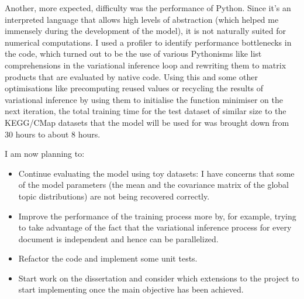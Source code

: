 \documentclass[12pt,a4]{article}
\begin{document}
Another, more expected, difficulty was the performance of Python. Since it's an interpreted language that allows high levels of abstraction (which helped me immensely during the development of the model), it is not naturally suited for numerical computations. I used a profiler to identify performance bottlenecks in the code, which turned out to be the use of various Pythonisms like list comprehensions in the variational inference loop and rewriting them to matrix products that are evaluated by native code. Using this and some other optimisations like precomputing reused values or recycling the results of variational inference by using them to initialise the function minimiser on the next iteration, the total training time for the test dataset of similar size to the KEGG/CMap datasets that the model will be used for was brought down from 30 hours to about 8 hours.

I am now planning to:

\begin{itemize}
\item Continue evaluating the model using toy datasets: I have concerns that some of the model parameters (the mean and the covariance matrix of the global topic distributions) are not being recovered correctly.
\item Improve the performance of the training process more by, for example, trying to take advantage of the fact that the variational inference process for every document is independent and hence can be parallelized.
\item Refactor the code and implement some unit tests.
\item Start work on the dissertation and consider which extensions to the project to start implementing once the main objective has been achieved.
\end{itemize}
\end{document}
